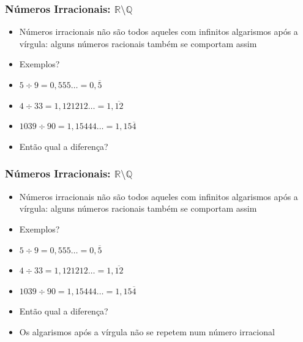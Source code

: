 \documentclass[usenames,dvipsnames,svgnames]{beamer}
\begin{document}
\begin{frame}	
	\frametitle{Números Irracionais: $\mathbb{R} \setminus \mathbb{Q}$}

	\begin{itemize}
		\item Números irracionais não são todos aqueles com infinitos algarismos após a vírgula: alguns números racionais também se comportam assim
		\item Exemplos?
		\item $5 \div 9 = 0,555\dots = 0,\overline{5}$
		\item $4 \div 33 = 1,121212\dots = 1,\overline{12}$
		\item $1039 \div 90 = 1,15444\dots = 1,15\overline{4}$
		\item Então qual a diferença?
	\end{itemize}
\end{frame}

\begin{frame}	
	\frametitle{Números Irracionais: $\mathbb{R} \setminus \mathbb{Q}$}

	\begin{itemize}
		\item Números irracionais não são todos aqueles com infinitos algarismos após a vírgula: alguns números racionais também se comportam assim
		\item Exemplos?
		\item $5 \div 9 = 0,555\dots = 0,\overline{5}$
		\item $4 \div 33 = 1,121212\dots = 1,\overline{12}$
		\item $1039 \div 90 = 1,15444\dots = 1,15\overline{4}$
		\item Então qual a diferença?
		\item Os algarismos após a vírgula {\color{red}não se repetem} num número irracional
	\end{itemize}
\end{frame}
\end{document}
